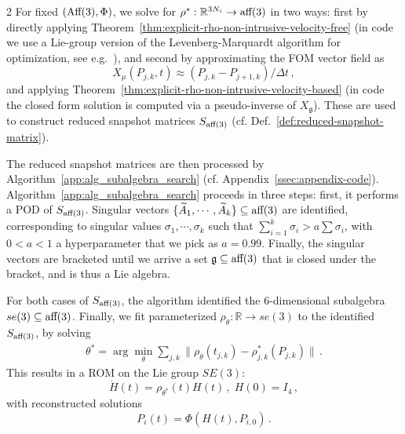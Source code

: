 \documentclass{article}
\newcommand{\g}{\mathfrak{g}}                               %
\newcommand{\R}{\mathbb{R}}                                 %
\begin{document}
\begin{multicols}{2}
For fixed $(\textnormal{Aff}(3),\Phi)$, we solve for $\rho^*:\R^{3N_i}\rightarrow \textnormal{aff}(3)$ in two ways: first by directly applying Theorem~\ref{thm:explicit-rho-non-intrusive-velocity-free} (in code we use a Lie-group version of the Levenberg-Marquardt algorithm for optimization, see e.g.~\cite[Chapter 8.4.2]{Absil2008}), and second by approximating the FOM vector field as
\begin{equation}\label{eq:approximate-velocity}
    X_\mu(P_{j,k},t) \approx (P_{j,k} - P_{j+1,k})/\Delta t\,,
\end{equation}
and applying Theorem~\ref{thm:explicit-rho-non-intrusive-velocity-based} (in code the closed form solution is computed via a pseudo-inverse of $X_\g$). These are used to construct reduced snapshot matrices $S_{\textnormal{aff}(3)}$ (cf. Def.~\ref{def:reduced-snapshot-matrix}). 

The reduced snapshot matrices are then processed by Algorithm~\ref{app:alg_subalgebra_search} (cf. Appendix~\ref{ssec:appendix-code}). Algorithm~\ref{app:alg_subalgebra_search} proceeds in three steps: first, it performs a POD of $S_{\textnormal{aff}(3)}$. Singular vectors $\{\widetilde{A}_1,\cdots,\widetilde{A}_k\}\subseteq \textnormal{aff}(3)$ are identified, corresponding to singular values $\sigma_1,\cdots,\sigma_k$ such that $\sum^k_{i=1}\sigma_i > a \sum \sigma_i$, with $0<a<1$ a hyperparameter that we pick as $a = 0.99$. Finally, the singular vectors are bracketed until we arrive a set $\g \subseteq \textnormal{aff}(3)$ that is closed under the bracket, and is thus a Lie algebra.

For both cases of $S_{\textnormal{aff}(3)}$, the algorithm identified the 6-dimensional subalgebra $se(3) \subseteq \textnormal{aff}(3)$. Finally, we fit parameterized $\rho_{\theta}:\R\rightarrow se(3)$ to the identified $S_{\textnormal{aff}(3)}$, by solving
\begin{eqnarray}
    \theta^* = \arg\min_\theta \sum_{j,k} \|\rho_{\theta}(t_{j,k}) - \rho^*_{j,k}(P_{j,k})\|\,.  
\end{eqnarray}
This results in a ROM on the Lie group $SE(3)$: %
\begin{equation}
    \dot{H}(t) = \rho_{\theta^*}(t) H(t)\,,\; H(0) = I_4\,,
\end{equation}
with reconstructed solutions
\begin{equation}
    P_{i}(t) = \Phi(H(t),P_{i,0})\,.
\end{equation}


\end{multicols}
\end{document}
